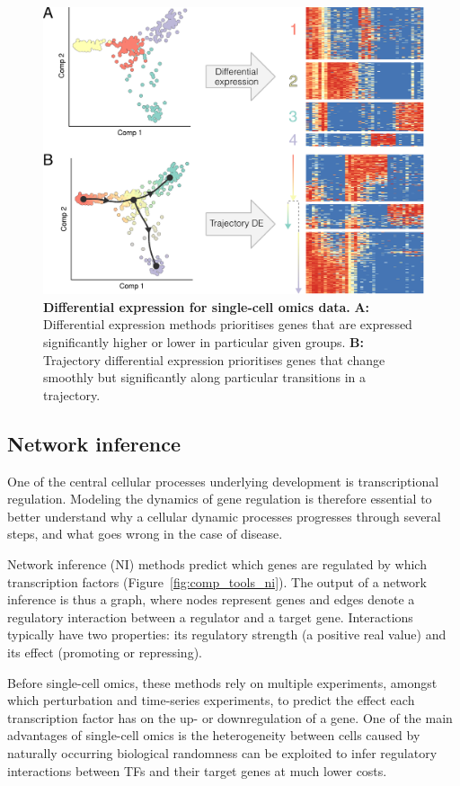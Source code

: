 \begin{figure}[htb!]
	\centering
	\includegraphics[width=.6\linewidth]{fig/comptools2/comptool_4_differentialexpression.pdf} 
	\caption{
		\textbf{Differential expression for single-cell omics data.}
		\textbf{A:} Differential expression methods prioritises genes that are expressed significantly higher or lower in particular given groups.
		\textbf{B:} Trajectory differential expression prioritises genes that change smoothly but significantly along particular transitions in a trajectory.
	}
	\label{fig:comp_tools_de}
\end{figure}

\subsection{Network inference}
One of the central cellular processes underlying development is transcriptional regulation. 	
Modeling the dynamics of gene regulation is therefore essential to better understand why a cellular dynamic processes progresses through several steps, and what goes wrong in the case of disease.

Network inference (NI) methods predict which genes are regulated by which transcription factors (Figure~\ref{fig:comp_tools_ni}). The output of a network inference is thus a graph, where nodes represent genes and edges denote a regulatory interaction between a regulator and a target gene. Interactions typically have two properties: its regulatory strength (a positive real value) and its effect (promoting or repressing).

Before single-cell omics, these methods rely on multiple experiments, amongst which perturbation and time-series experiments, to predict the effect each transcription factor has on the up- or downregulation of a gene. One of the main advantages of single-cell omics is the heterogeneity between cells caused by naturally occurring biological randomness \cite{padovan-merhar_usingvariabilitygene_2013} can be exploited to infer regulatory interactions between TFs and their target genes at much lower costs. 

